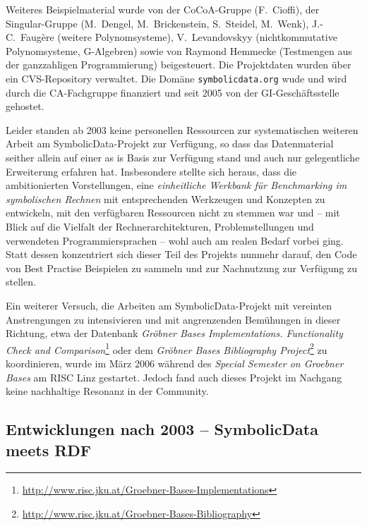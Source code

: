 \documentclass{article}
\newcommand{\SD}{{\sc Symbolic\-Data}}
\begin{document}
Weiteres Beispielmaterial wurde von der CoCoA-Gruppe (F.~Cioffi), der
Singular-Gruppe (M.~Dengel, M.~Brickenstein, S.~Steidel, M.~Wenk),
J.-C.~Faugère (weitere Polynomsysteme), V.~Levandovskyy (nichtkommutative
Polynomsysteme, G-Algebren) sowie von Raymond Hemmecke (Testmengen aus der
ganzzahligen Programmierung) beigesteuert.  Die Projektdaten wurden über ein
CVS-Repository verwaltet.  Die Domäne \texttt{symbolicdata.org} wude und wird
durch die CA-Fachgruppe finanziert und seit 2005 von der GI-Geschäftsstelle
gehostet.

Leider standen ab 2003 keine personellen Ressourcen zur systematischen
weiteren Arbeit am \SD-Projekt zur Verfügung, so dass das Datenmaterial
seither allein auf einer {\glqq}as is{\grqq} Basis zur Verfügung stand und
auch nur gelegentliche Erweiterung erfahren hat. Insbesondere stellte sich
heraus, dass die ambitionierten Vorstellungen, eine \emph{einheitliche
  Werkbank für Benchmarking im symbolischen Rechnen} mit entsprechenden
Werkzeugen und Konzepten zu entwickeln, mit den verfügbaren Ressourcen nicht
zu stemmen war und -- mit Blick auf die Vielfalt der Rechner\-architekturen,
Problemstellungen und verwendeten Programmiersprachen -- wohl auch am realen
Bedarf vorbei ging. Statt dessen konzentriert sich dieser Teil des Projekts
nunmehr darauf, den Code von Best Practise Beispielen zu sammeln und zur
Nachnutzung zur Verfügung zu stellen.

Ein weiterer Versuch, die Arbeiten am \SD-Projekt mit vereinten Anstrengungen
zu intensivieren und mit angrenzenden Bemühungen in dieser Richtung, etwa der
Datenbank \emph{Gröbner Bases Implementations. Functionality Check and
  Comparison}\footnote{\url{http://www.risc.jku.at/Groebner-Bases-Implementations}}
oder dem \emph{Gröbner Bases Bibliography
  Project}\footnote{\url{http://www.risc.jku.at/Groebner-Bases-Bibliography}}
zu koordinieren, wurde im März 2006 während des \emph{Special Semester on
  Groebner Bases} am RISC Linz gestartet.  Jedoch fand auch dieses Projekt im
Nachgang keine nachhaltige Resonanz in der Community. 

\subsection*{Entwicklungen nach 2003 -- {\SD} meets RDF}
\end{document}
